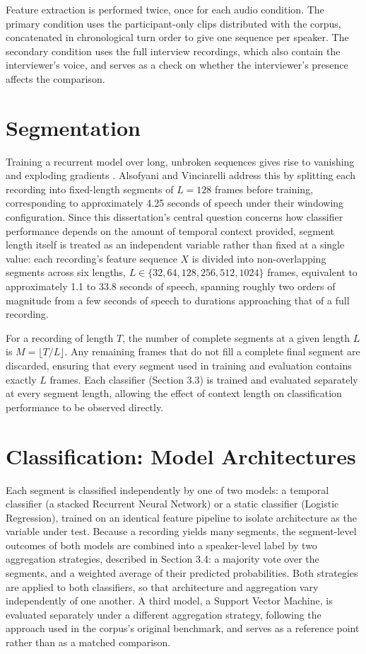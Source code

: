 \documentclass{mproj}
\begin{document}
Feature extraction is performed twice, once for each audio condition. The primary condition uses the participant-only clips distributed with the corpus, concatenated in chronological turn order to give one sequence per speaker. The secondary condition uses the full interview recordings, which also contain the interviewer's voice, and serves as a check on whether the interviewer's presence affects the comparison.

\section{Segmentation}\label{sec:segmentation}

Training a recurrent model over long, unbroken sequences gives rise to vanishing and exploding gradients \cite{pascanu2013}. Alsofyani and Vinciarelli \cite{alsofyani2021} address this by splitting each recording into fixed-length segments of $L = 128$ frames before training, corresponding to approximately 4.25 seconds of speech under their windowing configuration. Since this dissertation's central question concerns how classifier performance depends on the amount of temporal context provided, segment length itself is treated as an independent variable rather than fixed at a single value: each recording's feature sequence $X$ is divided into non-overlapping segments across six lengths, $L \in \{32, 64, 128, 256, 512, 1024\}$ frames, equivalent to approximately 1.1 to 33.8 seconds of speech, spanning roughly two orders of magnitude from a few seconds of speech to durations approaching that of a full recording.

For a recording of length $T$, the number of complete segments at a given length $L$ is $M = \lfloor T / L \rfloor$. Any remaining frames that do not fill a complete final segment are discarded, ensuring that every segment used in training and evaluation contains exactly $L$ frames. Each classifier (Section 3.3) is trained and evaluated separately at every segment length, allowing the effect of context length on classification performance to be observed directly.

\section{Classification: Model Architectures}\label{sec:models}

Each segment is classified independently by one of two models: a temporal classifier (a stacked Recurrent Neural Network) or a static classifier (Logistic Regression), trained on an identical feature pipeline to isolate architecture as the variable under test. Because a recording yields many segments, the segment-level outcomes of both models are combined into a speaker-level label by two aggregation strategies, described in Section 3.4: a majority vote over the segments, and a weighted average of their predicted probabilities. Both strategies are applied to both classifiers, so that architecture and aggregation vary independently of one another. A third model, a Support Vector Machine, is evaluated separately under a different aggregation strategy, following the approach used in the corpus's original benchmark, and serves as a reference point rather than as a matched comparison.
\end{document}
